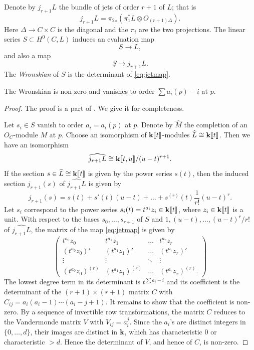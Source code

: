 \documentclass[11pt]{amsart}
\begin{document}
Denote by \(j_{r+1}L\) the bundle of jets of order \(r+1\) of \(L\);
that is 
\[ j_{r+1}L = {\pi_2}_* \left( \pi_1^* L \otimes O_{(r+1) \Delta} \right).\]
Here \(\Delta \to C \times C\) is the diagonal and the \(\pi_i\) are the two projections.
The linear series \(S \subset H^0(C, L)\) induces an evaluation map
\[ \underline S \to L,\]
and also a map
\begin{equation}\label{eq:jetmap}
  \underline S \to j_{r+1} L.
\end{equation}
The \emph{Wronskian} of \(S\) is the determinant of \eqref{eq:jetmap}.

\begin{proposition}\label{prop:wronskian}
  The Wronskian is non-zero and vanishes to order \(\sum a_i(p)-i\) at \(p\).
\end{proposition}
\begin{proof}
  The proof is a part of \cite[Proposition~1.1]{eis.har:83}.
  We give it for completeness.
  
  Let \(s_i \in S\) vanish to order \(a_i = a_i(p)\) at \(p\).
  Denote by \(\widehat M\) the completion of an \(O_C\)-module \(M\) at \(p\).
  Choose an isomorphism of \(\mathbf k\llbracket t \rrbracket\)-modules \(\widehat L \cong \mathbf k\llbracket t \rrbracket\).
  Then we have an isomorphism 
  \[
    \widehat{j_{r+1}L} \cong \mathbf k\llbracket t,u \rrbracket/(u-t)^{r+1}.
  \]
  If the section \(s \in \widehat L \cong \mathbf k\llbracket t\rrbracket\) is given by the power series \(s(t)\), then the induced section \(j_{r+1}(s)\) of \(\widehat{j_{r+1} L}\) is given by
  \[ j_{r+1}(s) = s(t) + s'(t)(u-t) + \dots + s^{(r)}(t)\frac{1}{r!} (u-t)^r.\]
  Let \(s_i\) correspond to the power series \(s_i(t) = t^{a_i}z_i \in \mathbf k\llbracket t \rrbracket\), where \(z_i \in \mathbf k\llbracket t \rrbracket\) is a unit.
  With respect to the bases \(s_0, \dots, s_{r+1}\) of \(S\) and \(1, (u-t), \dots, (u-t)^{r}/r!\) of \(\widehat{j_{r+1}L}\), the matrix of the map \eqref{eq:jetmap} is given by
  \[
    \begin{pmatrix}
      t^{a_0} z_0 & t^{a_1}z_1 & \dots & t^{a_r}z_r \\
      (t^{a_0} z_0)' & (t^{a_1}z_1)' & \dots & (t^{a_r}z_r)' \\
      \vdots & \vdots & \ddots & \vdots \\
      (t^{a_0} z_0)^{(r)} & (t^{a_1}z_1)^{(r)} & \dots & (t^{a_r}z_r)^{(r)}.
    \end{pmatrix}
  \]
  The lowest degree term in its determinant is \(t^{\sum a_i - i}\) and its coefficient is the determinant of the \((r+1) \times (r+1)\) matrix \(C\) with \(C_{ij} = a_i(a_i-1)\cdots(a_i-j+1)\).
  It remains to show that the coefficient is non-zero.
  By a sequence of invertible row transformations, the matrix \(C\) reduces to the Vandermonde matrix \(V\) with \(V_{ij} = a_i^j\).
  Since the \(a_i\)'s are distinct integers in \(\{0,\dots, d\}\), their images are distinct in \(\mathbf k\), which has characteristic 0 or characteristic \(> d\).
  Hence the determinant of \(V\), and hence of \(C\), is non-zero.
\end{proof}
\end{document}

